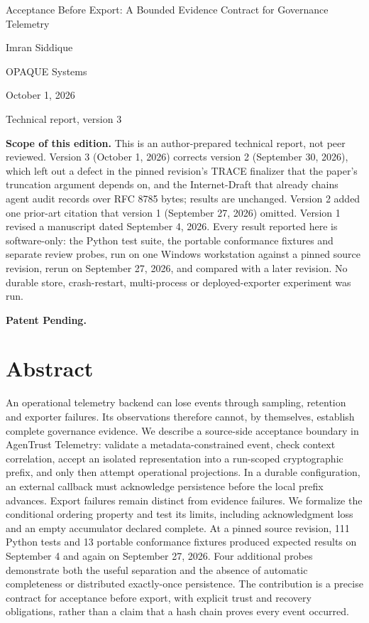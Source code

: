 \documentclass[10pt,letterpaper]{article}
\begin{document}
{\raggedright\headingfont\fontsize{21}{26}\selectfont\color{OceanBlue} Acceptance Before Export: A Bounded Evidence Contract for Governance Telemetry\par}

\vspace{8pt}Imran Siddique\par OPAQUE Systems\par\vspace{4pt}October 1, 2026\par Technical report, version 3\par

\vspace{5pt}{\color{CoralGreen}\hrule}\vspace{8pt}

\textbf{Scope of this edition.} This is an author-prepared technical report, not peer reviewed. Version 3 (October 1, 2026) corrects version 2 (September 30, 2026), which left out a defect in the pinned revision's TRACE finalizer that the paper's truncation argument depends on, and the Internet-Draft that already chains agent audit records over RFC 8785 bytes; results are unchanged. Version 2 added one prior-art citation that version 1 (September 27, 2026) omitted. Version 1 revised a manuscript dated September 4, 2026. Every result reported here is software-only: the Python test suite, the portable conformance fixtures and separate review probes, run on one Windows workstation against a pinned source revision, rerun on September 27, 2026, and compared with a later revision. No durable store, crash-restart, multi-process or deployed-exporter experiment was run.\par

\noindent\textbf{Patent Pending.}

\section*{Abstract}

An operational telemetry backend can lose events through sampling, retention and exporter failures. Its observations therefore cannot, by themselves, establish complete governance evidence. We describe a source-side acceptance boundary in AgenTrust Telemetry: validate a metadata-constrained event, check context correlation, accept an isolated representation into a run-scoped cryptographic prefix, and only then attempt operational projections. In a durable configuration, an external callback must acknowledge persistence before the local prefix advances. Export failures remain distinct from evidence failures. We formalize the conditional ordering property and test its limits, including acknowledgment loss and an empty accumulator declared complete. At a pinned source revision, 111 Python tests and 13 portable conformance fixtures produced expected results on September 4 and again on September 27, 2026. Four additional probes demonstrate both the useful separation and the absence of automatic completeness or distributed exactly-once persistence. The contribution is a precise contract for acceptance before export, with explicit trust and recovery obligations, rather than a claim that a hash chain proves every event occurred.
\end{document}
